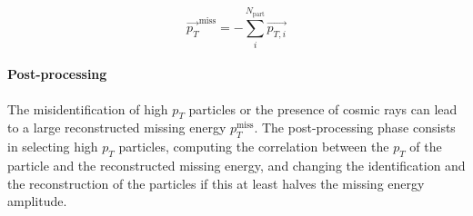 \begin{equation}
    \vec{p_T}^{\text{miss}}=-\sum_i^{N_{\text{part}}} \vec{p_{T,i}}
\end{equation}

\paragraph*{Post-processing}
The misidentification of high $p_T$ particles or the presence of cosmic rays can lead to a large reconstructed missing energy $p_T^{\text{miss}}$.
The post-processing phase consists in selecting high $p_T$ particles, computing the correlation between the $p_T$ of the particle and the reconstructed missing energy, and changing the identification and the reconstruction of the particles if this at least halves the missing energy amplitude.\\


